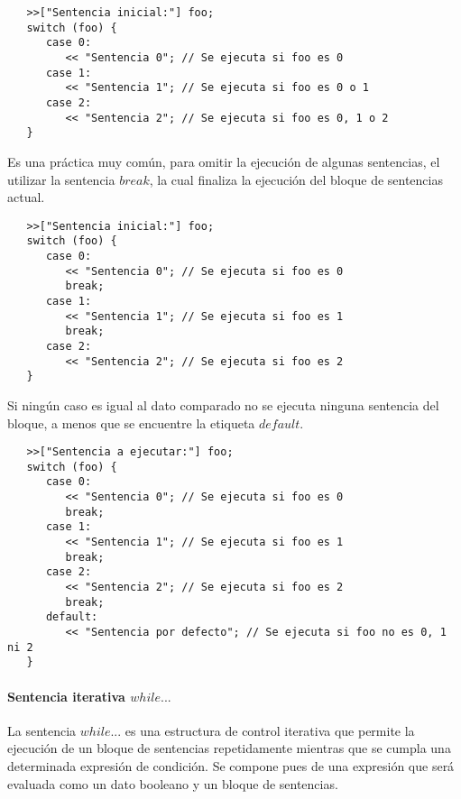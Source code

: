 \begin{lstlisting}
   >>["Sentencia inicial:"] foo;
   switch (foo) {
      case 0: 
         << "Sentencia 0"; // Se ejecuta si foo es 0
      case 1:
         << "Sentencia 1"; // Se ejecuta si foo es 0 o 1
      case 2:
         << "Sentencia 2"; // Se ejecuta si foo es 0, 1 o 2
   }
\end{lstlisting}

Es una práctica muy común, para omitir la ejecución de algunas sentencias, el utilizar la sentencia $break$, la cual finaliza la 
ejecución del bloque de sentencias actual. \\ 

\begin{lstlisting}
   >>["Sentencia inicial:"] foo;
   switch (foo) {
      case 0: 
         << "Sentencia 0"; // Se ejecuta si foo es 0
         break;
      case 1:
         << "Sentencia 1"; // Se ejecuta si foo es 1
         break;
      case 2:
         << "Sentencia 2"; // Se ejecuta si foo es 2
   }
\end{lstlisting}

Si ningún caso es igual al dato comparado no se ejecuta ninguna sentencia del bloque, a menos que se encuentre 
la etiqueta $default$. \\

\begin{lstlisting}
   >>["Sentencia a ejecutar:"] foo;
   switch (foo) {
      case 0: 
         << "Sentencia 0"; // Se ejecuta si foo es 0
         break;
      case 1:
         << "Sentencia 1"; // Se ejecuta si foo es 1
         break;
      case 2:
         << "Sentencia 2"; // Se ejecuta si foo es 2
         break;
      default:
         << "Sentencia por defecto"; // Se ejecuta si foo no es 0, 1 ni 2
   }
\end{lstlisting}



\paragraph{Sentencia iterativa $while...$} \label{sec:stmt_while}

La sentencia $while...$ es una estructura de control iterativa que permite la ejecución de un bloque de 
sentencias repetidamente mientras que se cumpla una determinada expresión de condición. Se compone pues de una expresión que será evaluada como 
un dato booleano y un bloque de sentencias. \\

